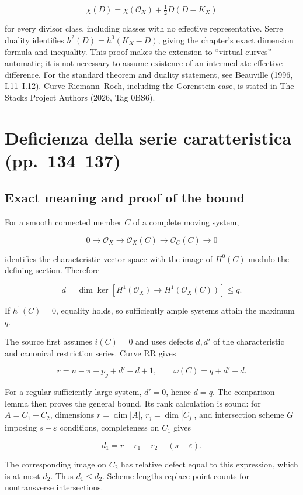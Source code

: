 \[
\chi(D)=\chi(\mathcal O_X)+\tfrac12D(D-K_X)
\]

for every divisor class, including classes with no effective representative. Serre duality identifies \(h^2(D)=h^0(K_X-D)\), giving the chapter's exact dimension formula and inequality. This proof makes the extension to ``virtual curves'' automatic; it is not necessary to assume existence of an intermediate effective difference. For the standard theorem and duality statement, see Beauville (1996, I.11--I.12). Curve Riemann--Roch, including the Gorenstein case, is stated in The Stacks Project Authors (2026, Tag 0BS6).

\section[Deficienza della serie caratteristica]{Deficienza della serie caratteristica (pp.~134--137)}\label{enriques-iv-12}

\subsection{Exact meaning and proof of the bound}

For a smooth connected member \(C\) of a complete moving system,

\[
0\to\mathcal O_X\to\mathcal O_X(C)\to\mathcal O_C(C)\to0
\]

identifies the characteristic vector space with the image of \(H^0(C)\) modulo the defining section. Therefore

\[
\boxed{d=\dim\ker[H^1(\mathcal O_X)\to H^1(\mathcal O_X(C))]\le q.}
\tag{IV.12.1}
\]

If \(h^1(C)=0\), equality holds, so sufficiently ample systems attain the maximum \(q\).

The source first assumes \(i(C)=0\) and uses defects \(d,d'\) of the characteristic and canonical restriction series. Curve RR gives

\[
r=n-\pi+p_g+d'-d+1,\qquad
\omega(C)=q+d'-d.
\]

For a regular sufficiently large system, \(d'=0\), hence \(d=q\). The comparison lemma then proves the general bound. Its rank calculation is sound: for \(A=C_1+C_2\), dimensions \(r=\dim|A|\), \(r_j=\dim|C_j|\), and intersection scheme \(G\) imposing \(s-\varepsilon\) conditions, completeness on \(C_1\) gives

\[
d_1=r-r_1-r_2-(s-\varepsilon).
\]

The corresponding image on \(C_2\) has relative defect equal to this expression, which is at most \(d_2\). Thus \(d_1\le d_2\). Scheme lengths replace point counts for nontransverse intersections.

